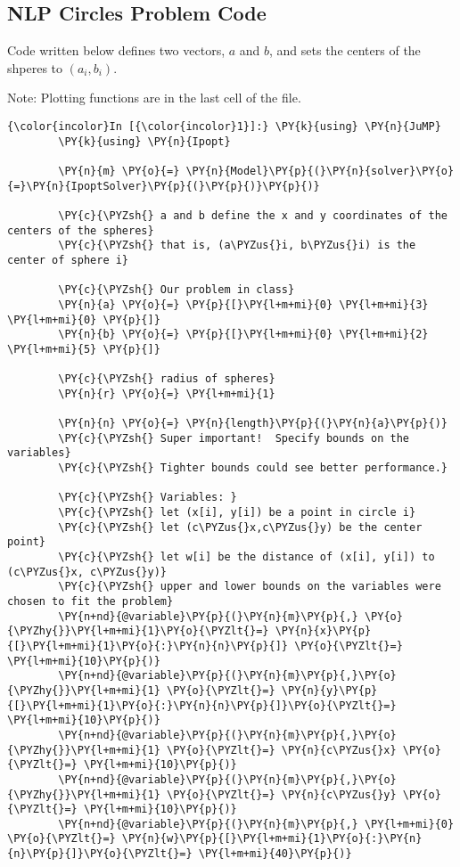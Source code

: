 
\subsection{NLP Circles Problem Code}
\label{NLP:Circles-Problem}

Code written below defines two vectors, \(a\) and \(b\), and sets the
centers of the shperes to \((a_i, b_i)\).

Note: Plotting functions are in the last cell of the file.

    \begin{Verbatim}[commandchars=\\\{\}]
{\color{incolor}In [{\color{incolor}1}]:} \PY{k}{using} \PY{n}{JuMP}
        \PY{k}{using} \PY{n}{Ipopt}
        
        \PY{n}{m} \PY{o}{=} \PY{n}{Model}\PY{p}{(}\PY{n}{solver}\PY{o}{=}\PY{n}{IpoptSolver}\PY{p}{(}\PY{p}{)}\PY{p}{)}
        
        \PY{c}{\PYZsh{} a and b define the x and y coordinates of the centers of the spheres}
        \PY{c}{\PYZsh{} that is, (a\PYZus{}i, b\PYZus{}i) is the center of sphere i}
        
        \PY{c}{\PYZsh{} Our problem in class}
        \PY{n}{a} \PY{o}{=} \PY{p}{[}\PY{l+m+mi}{0} \PY{l+m+mi}{3} \PY{l+m+mi}{0} \PY{p}{]}
        \PY{n}{b} \PY{o}{=} \PY{p}{[}\PY{l+m+mi}{0} \PY{l+m+mi}{2} \PY{l+m+mi}{5} \PY{p}{]}
        
        \PY{c}{\PYZsh{} radius of spheres}
        \PY{n}{r} \PY{o}{=} \PY{l+m+mi}{1}  
        
        \PY{n}{n} \PY{o}{=} \PY{n}{length}\PY{p}{(}\PY{n}{a}\PY{p}{)}
        \PY{c}{\PYZsh{} Super important!  Specify bounds on the variables}
        \PY{c}{\PYZsh{} Tighter bounds could see better performance.}
        
        \PY{c}{\PYZsh{} Variables: }
        \PY{c}{\PYZsh{} let (x[i], y[i]) be a point in circle i}
        \PY{c}{\PYZsh{} let (c\PYZus{}x,c\PYZus{}y) be the center point}
        \PY{c}{\PYZsh{} let w[i] be the distance of (x[i], y[i]) to (c\PYZus{}x, c\PYZus{}y)}
        \PY{c}{\PYZsh{} upper and lower bounds on the variables were chosen to fit the problem}
        \PY{n+nd}{@variable}\PY{p}{(}\PY{n}{m}\PY{p}{,} \PY{o}{\PYZhy{}}\PY{l+m+mi}{1}\PY{o}{\PYZlt{}=} \PY{n}{x}\PY{p}{[}\PY{l+m+mi}{1}\PY{o}{:}\PY{n}{n}\PY{p}{]} \PY{o}{\PYZlt{}=} \PY{l+m+mi}{10}\PY{p}{)}
        \PY{n+nd}{@variable}\PY{p}{(}\PY{n}{m}\PY{p}{,}\PY{o}{\PYZhy{}}\PY{l+m+mi}{1} \PY{o}{\PYZlt{}=} \PY{n}{y}\PY{p}{[}\PY{l+m+mi}{1}\PY{o}{:}\PY{n}{n}\PY{p}{]}\PY{o}{\PYZlt{}=} \PY{l+m+mi}{10}\PY{p}{)}
        \PY{n+nd}{@variable}\PY{p}{(}\PY{n}{m}\PY{p}{,}\PY{o}{\PYZhy{}}\PY{l+m+mi}{1} \PY{o}{\PYZlt{}=} \PY{n}{c\PYZus{}x} \PY{o}{\PYZlt{}=} \PY{l+m+mi}{10}\PY{p}{)}
        \PY{n+nd}{@variable}\PY{p}{(}\PY{n}{m}\PY{p}{,}\PY{o}{\PYZhy{}}\PY{l+m+mi}{1} \PY{o}{\PYZlt{}=} \PY{n}{c\PYZus{}y} \PY{o}{\PYZlt{}=} \PY{l+m+mi}{10}\PY{p}{)}
        \PY{n+nd}{@variable}\PY{p}{(}\PY{n}{m}\PY{p}{,} \PY{l+m+mi}{0} \PY{o}{\PYZlt{}=} \PY{n}{w}\PY{p}{[}\PY{l+m+mi}{1}\PY{o}{:}\PY{n}{n}\PY{p}{]}\PY{o}{\PYZlt{}=} \PY{l+m+mi}{40}\PY{p}{)}
        

\end{Verbatim}
